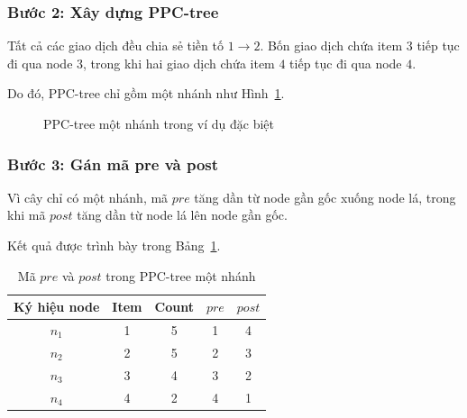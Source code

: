\subsubsection{Bước 2: Xây dựng PPC-tree}

Tất cả các giao dịch đều chia sẻ tiền tố $1\rightarrow2$. Bốn giao dịch chứa item $3$ tiếp tục đi qua node $3$, trong khi hai giao dịch chứa item $4$ tiếp tục đi qua node $4$.

Do đó, PPC-tree chỉ gồm một nhánh như Hình~\ref{fig:special-single-path-tree}.

\begin{figure}[H]
\centering
{}
\caption{PPC-tree một nhánh trong ví dụ đặc biệt}
\label{fig:special-single-path-tree}
\end{figure}

\subsubsection{Bước 3: Gán mã pre và post}

Vì cây chỉ có một nhánh, mã $pre$ tăng dần từ node gần gốc xuống node lá, trong khi mã $post$ tăng dần từ node lá lên node gần gốc.

Kết quả được trình bày trong Bảng~\ref{tab:special-prepost-codes}.

\begin{table}[H]
\centering
\caption{Mã $pre$ và $post$ trong PPC-tree một nhánh}
\label{tab:special-prepost-codes}
\begin{tabular}{ccccc}
\toprule
Ký hiệu node & Item & Count & $pre$ & $post$ \\
\midrule
$n_1$ & 1 & 5 & 1 & 4 \\
$n_2$ & 2 & 5 & 2 & 3 \\
$n_3$ & 3 & 4 & 3 & 2 \\
$n_4$ & 4 & 2 & 4 & 1 \\
\bottomrule
\end{tabular}
\end{table}

